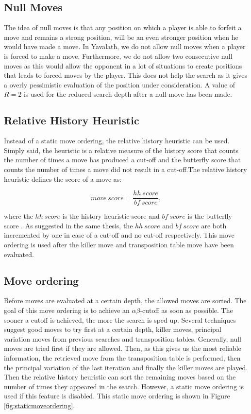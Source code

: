 \documentclass[11pt]{article}
\begin{document}
\subsection{Null Moves}
\label{-subsec:nullmoves}
The idea of null moves is that any position on which a player is able to forfeit a move and remains a strong position, will be an even stronger position when he would have made a move. In Yavalath, we do not allow null moves when a player is forced to make a move. Furthermore, we do not allow two consecutive null moves as this would allow the opponent in a lot of situations to create positions that leads to forced moves by the player. This does not help the search as it gives a overly pessimistic evaluation of the position under consideration. A value of $R=2$ is used for the reduced search depth after a null move has been made.

\subsection{Relative History Heuristic}
\label{-subsec:relativehistoryheuristic}
Instead of a static move ordering, the relative history heuristic can be used. Simply said, the heuristic is a relative measure of the history score that counts the number of times a move has produced a cut-off and the butterfly score that counts the number of times a move did not result in a cut-off.The relative history heuristic defines the score of a move as:

\begin{equation}
	move\ score = \frac{hh\ score}{bf\ score},
\end{equation}

where the $hh\ score$ is the history heuristic score and $bf\ score$ is the butterfly score \cite{Winands2004}. As suggested in the same thesis, the $hh\ score$ and $bf\ score$ are both incremented by one in case of a cut-off and no cut-off respectively. This move ordering is used after the killer move and transposition table move have been evaluated.

\subsection{Move ordering}
\label{-subsec:moveordering}
Before moves are evaluated at a certain depth, the allowed moves are sorted. The goal of this move ordering is to achieve an $\alpha\beta$-cutoff as soon as possible. The sooner a cutoff is achieved, the more the search is sped up. Several techniques suggest good moves to try first at a certain depth, killer moves, principal variation moves from previous searches and transposition tables. Generally, null moves are tried first if they are allowed. Then, as this gives us the most reliable information, the retrieved move from the transposition table is performed, then the principal variation of the last iteration and finally the killer moves are played. Then the relative history heuristic can sort the remaining moves based on the number of times they appeared in the search. However, a static move ordering is used if this feature is disabled. This static move ordering is shown in Figure \ref{fig:staticmoveordering}.
\end{document}
